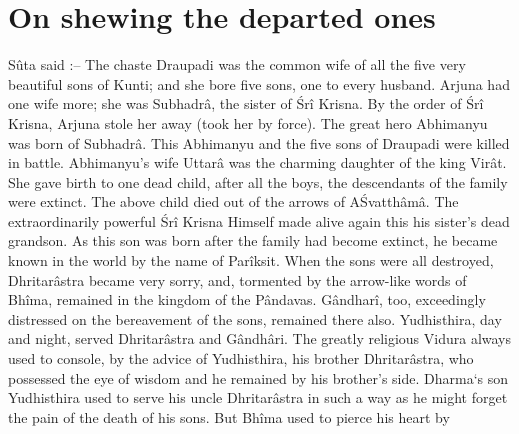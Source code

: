﻿\chapter{On shewing the departed ones}

S\^uta said :--  The chaste Draupadi was the common wife of all the five very beautiful sons of Kunti; and she bore five sons, one to every husband. Arjuna had one wife more; she was Subhadr\^a, the sister of \'Sr\^i Krisna. By the order of \'Sr\^i Krisna, Arjuna stole her away (took her by force). The great hero Abhimanyu was born of Subhadr\^a. This Abhimanyu and the five sons of Draupadi were killed in battle. Abhimanyu's wife Uttar\^a was the charming daughter of the king Vir\^at. She gave birth to one dead child, after all the boys, the descendants of the family were extinct. The above child died out of the arrows of A\'Svatth\^am\^a. The extraordinarily powerful \'Sr\^i Krisna Himself made alive again this his sister's dead grandson. As this son was born after the family had become extinct, he became known in the world by the name of Par\^iksit. When the sons were all destroyed, Dhritar\^astra became very sorry, and, tormented by the arrow-like words of Bh\^ima, remained in the kingdom of the P\^andavas. G\^andhar\^i, too, exceedingly distressed on the bereavement of the sons, remained there also. Yudhisthira, day and night, served Dhritar\^astra and G\^andh\^ari. The greatly religious Vidura always used to console, by the advice of Yudhisthira, his brother Dhritar\^astra, who possessed the eye of wisdom and he remained by his brother's side. Dharma`s son Yudhisthira used to serve his uncle Dhritar\^astra in such a way as he might forget the pain of the death of his sons. But Bh\^ima used to pierce his heart by

